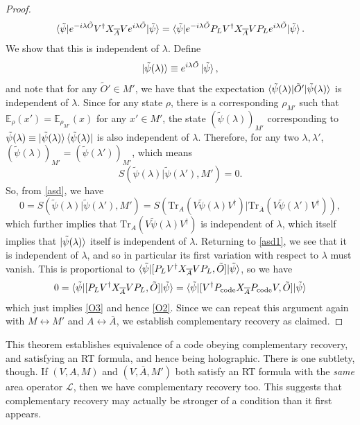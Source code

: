 \documentclass[12pt,a4paper]{report}
\numberwithin{equation}{section}
\newcommand{\ketbra}[2]{\ket{#1}\bra{#2}}
\newcommand{\ketbras}[1]{\ketbra{#1}{#1}}
\newcommand{\Pc}{P_{\text{code}}}
\newcommand{\ol}[1]{\overline{#1}}
\newcommand{\tr}{\text{Tr}}
\theoremstyle{definition}
\theoremstyle{theorem}
\theoremstyle{theorem}
\theoremstyle{example}
\theoremstyle{definition}
\begin{document}
\begin{proof}
	\begin{equation}\label{asd1}
		\braket{\tilde{\psi}|e^{-i\lambda\tilde{O}}V^{\dagger}X_{\ol{A}}Ve^{i\lambda\tilde{O}}|\tilde{\psi}}=\braket{\tilde{\psi}|e^{-i\lambda\tilde{O}}P_{L}V^{\dagger}X_{\ol{A}}VP_{L}e^{i\lambda\tilde{O}}|\tilde{\psi}}.
	\end{equation}
	We show that this is independent of $\lambda$. Define
	\begin{equation}
		\ket{\tilde{\psi}(\lambda)}\equiv e^{i\lambda\tilde{O}}\ket{\tilde{\psi}},
	\end{equation}
	and note that for any $\tilde{O}'\in M'$, we have that the expectation $\braket{\tilde{\psi}(\lambda)|\tilde{O}'|\tilde{\psi}(\lambda)}$ is independent of $\lambda$. Since for any state $\rho$, there is a corresponding $\rho_{M'}$ such that $\mathbb{E}_{\rho}(x')=\mathbb{E}_{\rho_{M'}}(x)$ for any $x'\in M'$, the state $(\tilde{\psi}(\lambda))_{M'}$ corresponding to $\tilde{\psi}(\lambda)\equiv\ketbras{\tilde{\psi}(\lambda)}$ is also independent of $\lambda$. Therefore, for any two $\lambda,\lambda'$, $(\tilde{\psi}(\lambda))_{M'}=(\tilde{\psi}(\lambda'))_{M'}$, which means
	\begin{equation}
		S(\tilde{\psi}(\lambda)|\tilde{\psi}(\lambda'),M')=0.
	\end{equation}
	So, from \ref{asd}, we have
	\begin{equation}
		0=S(\tilde{\psi}(\lambda)|\tilde{\psi}(\lambda'),M')=S(\tr_{{A}}(V\tilde{\psi}(\lambda) V^{\dagger})|\tr_{\ol{A}}(V\tilde{\psi}(\lambda') V^{\dagger})),
	\end{equation}
	which further implies that $\tr_{A}(V\tilde{\psi}(\lambda)V^{\dagger})$ is independent of $\lambda$, which itself implies that $\ket{\tilde{\psi}(\lambda)}$ itself is independent of $\lambda$. Returning to \ref{asd1}, we see that it is independent of $\lambda$, and so in particular its first variation with respect to $\lambda$ must vanish. This is proportional to $\braket{\tilde{\psi}|[P_{L}V^{\dagger}X_{\ol{A}}VP_{L},\tilde{O}]|\tilde{\psi}}$, so we have
	\begin{equation}
		0=\braket{\tilde{\psi}|[P_{L}V^{\dagger}X_{\ol{A}}VP_{L},\tilde{O}]|\tilde{\psi}}=\braket{\tilde{\psi}|[V^{\dagger}\Pc X_{\ol{A}}\Pc V,\tilde{O}]|\tilde{\psi}}
	\end{equation}
	which just implies \ref{O3} and hence \ref{O2}. Since we can repeat this argument again with $M\leftrightarrow M'$ and $A\leftrightarrow \ol{A}$, we establish complementary recovery as claimed.
\end{proof}
This theorem establishes equivalence of a code obeying complementary recovery, and satisfying an RT formula, and hence being holographic. There is one subtlety, though. If $(V,A,M)$ and $(V,\ol{A},M')$ both satisfy an RT formula with the \textit{same} area operator $\mathcal{L}$, then we have complementary recovery too. This suggests that complementary recovery may actually be stronger of a condition than it first appears.  
\end{document}
